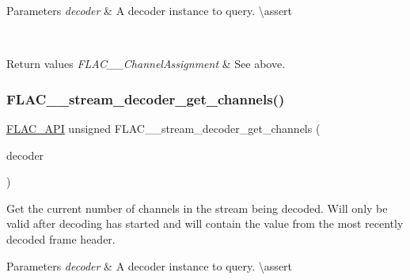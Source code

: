 \begin{DoxyParams}{Parameters}
{\em decoder} & A decoder instance to query. \textbackslash{}assert 
\begin{DoxyCode}{1}
\end{DoxyCode}
 \\
\hline
\end{DoxyParams}

\begin{DoxyRetVals}{Return values}
{\em F\+L\+A\+C\+\_\+\+\_\+\+Channel\+Assignment} & See above. \\
\hline
\end{DoxyRetVals}
\mbox{\label{group__flac__stream__decoder_ga42b7d224faeee633e6359ac1f921f39a}} 
\subsubsection{\texorpdfstring{FLAC\_\_stream\_decoder\_get\_channels()}{FLAC\_\_stream\_decoder\_get\_channels()}}
{\footnotesize\ttfamily \mbox{\hyperlink{group__flac__export_ga56ca07df8a23310707732b1c0007d6f5}{F\+L\+A\+C\+\_\+\+A\+PI}} unsigned F\+L\+A\+C\+\_\+\+\_\+stream\+\_\+decoder\+\_\+get\+\_\+channels (\begin{DoxyParamCaption}\item[{const \mbox{\hyperlink{struct_f_l_a_c_____stream_decoder}{F\+L\+A\+C\+\_\+\+\_\+\+Stream\+Decoder}} $\ast$}]{decoder }\end{DoxyParamCaption})}

Get the current number of channels in the stream being decoded. Will only be valid after decoding has started and will contain the value from the most recently decoded frame header.


\begin{DoxyParams}{Parameters}
{\em decoder} & A decoder instance to query. \textbackslash{}assert 
\begin{DoxyCode}{1}
\end{DoxyCode}
 \\
\hline
\end{DoxyParams}

